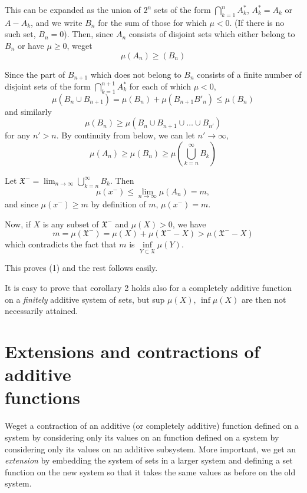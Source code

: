 This can be expanded as the union of $2^n$ sets of the form
$\bigcap\limits^{n}_{k=1} A^*_k$, $A^*_k = A_k$ or $A - A_k$,
and we write 
$B_n$ for the sum of those for which $\mu < 0$. (If there is no such
set, $B_n = 0$). Then, since $A_n$ consists of disjoint sets which
either belong to $B_n$ or have $\mu \geq 0$, we\pageoriginale get
$$
\mu(A_n)\ge(B_n)
$$

Since the part of $B_{n+1}$ which does not belong to $B_n$ consists of
a finite number of disjoint sets of the form
$\bigcap\limits^{n+1}_{k=1} A^*_k$ for each of which $\mu <
0$,  
$$
\mu (B_n\cup B_{n+1}) = \mu(B_n) + \mu(B_{n+1} B'_n)\le\mu(B_n)
$$
and similarly
$$
\mu(B_n) \geq \mu(B_n \cup B_{n+1}\cup \ldots \cup B_{n'})
$$
for any $n' > n$. By continuity from below, we can let $n'
\rightarrow \infty$, 
$$
\mu(A_n) \geq \mu (B_n) \geq \mu \left(\bigcup^{\infty}_{k=n} B_k\right)
$$

Let $\mathfrak{X}^-= \lim_{n\to\infty}  \bigcup\limits^{\infty}_{k=n} B_k$. Then  
$$
\mu(x^-) \leq \lim_{n\to\infty} \mu (A_n)=m,
$$
and since $\mu(x^-) \geq m$ by definition of $m$, $\mu(x^-)=m$.

Now, if $X$ is any subset of $\mathfrak{X}^-$ and $\mu (X) > 0$, we have
$$
m=\mu(\mathfrak{X}^-)= \mu (X) + \mu(\mathfrak{X}^- - X) > \mu (\mathfrak{X}^- - X)
$$ 
which contradicts the fact that $m$ is $\inf\limits_{Y\subset\mathfrak{X}}\mu(Y)$. 

This proves (1) and the rest follows easily.

It is easy to prove that corollary 2 holds also for a completely
additive function on a {\em finitely} additive system of sets, but sup
$\mu(X)$, $\inf \mu(X)$ are then not necessarily attained. 

\section[Extensions and contractions of...]{Extensions and contractions of additive\\ functions}\label{chap1:sec6}

We\pageoriginale get a contraction of an additive (or completely additive) function
defined on a system by considering only its values on an function
defined on a system by considering only its values on an additive
subsystem.  More important, we get an  {\em extension} by embedding the
system of sets in a larger system and defining a set function on the
new system so that it takes the same values as before on the old system. 

